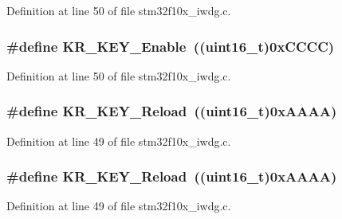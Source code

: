 Definition at line 50 of file stm32f10x\+\_\+iwdg.\+c.

\subsubsection[{\texorpdfstring{K\+R\+\_\+\+K\+E\+Y\+\_\+\+Enable}{KR_KEY_Enable}}]{\setlength{\rightskip}{0pt plus 5cm}\#define K\+R\+\_\+\+K\+E\+Y\+\_\+\+Enable~(({\bf uint16\+\_\+t})0x\+C\+C\+C\+C)}\hypertarget{group___i_w_d_g___private___defines_ga833138e20c8a26786dd7ca3b132152ed}{}\label{group___i_w_d_g___private___defines_ga833138e20c8a26786dd7ca3b132152ed}


Definition at line 50 of file stm32f10x\+\_\+iwdg.\+c.

\subsubsection[{\texorpdfstring{K\+R\+\_\+\+K\+E\+Y\+\_\+\+Reload}{KR_KEY_Reload}}]{\setlength{\rightskip}{0pt plus 5cm}\#define K\+R\+\_\+\+K\+E\+Y\+\_\+\+Reload~(({\bf uint16\+\_\+t})0x\+A\+A\+A\+A)}\hypertarget{group___i_w_d_g___private___defines_gad5e5efc1dbd6a045da5a36c3d9df16a5}{}\label{group___i_w_d_g___private___defines_gad5e5efc1dbd6a045da5a36c3d9df16a5}


Definition at line 49 of file stm32f10x\+\_\+iwdg.\+c.

\subsubsection[{\texorpdfstring{K\+R\+\_\+\+K\+E\+Y\+\_\+\+Reload}{KR_KEY_Reload}}]{\setlength{\rightskip}{0pt plus 5cm}\#define K\+R\+\_\+\+K\+E\+Y\+\_\+\+Reload~(({\bf uint16\+\_\+t})0x\+A\+A\+A\+A)}\hypertarget{group___i_w_d_g___private___defines_gad5e5efc1dbd6a045da5a36c3d9df16a5}{}\label{group___i_w_d_g___private___defines_gad5e5efc1dbd6a045da5a36c3d9df16a5}


Definition at line 49 of file stm32f10x\+\_\+iwdg.\+c.

